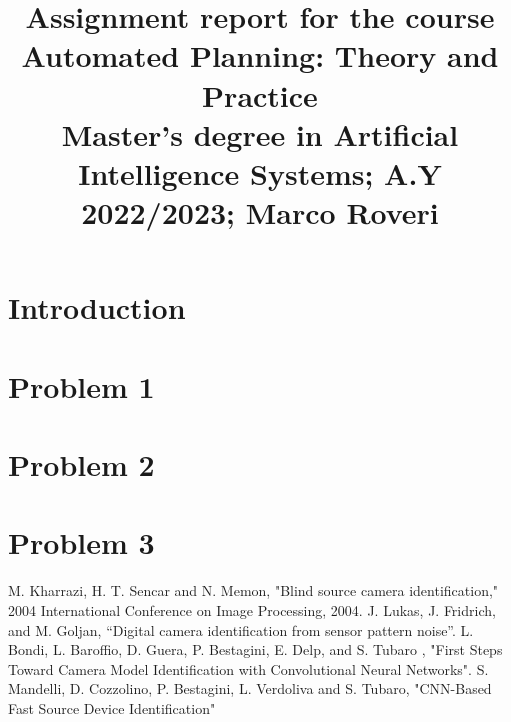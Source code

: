 \documentclass[conference]{IEEEtran}
\begin{document}
\title{Assignment report for the course\\ Automated Planning: Theory and Practice\\
{\footnotesize Master's degree in Artificial Intelligence Systems;
A.Y 2022/2023;
Marco Roveri}
}

\author{

\and
{}

}

\maketitle

\section{Introduction}

\section{Problem 1}

\section{Problem 2}

\section{Problem 3}


\begin{thebibliography}{00}
 M. Kharrazi, H. T. Sencar and N. Memon, "Blind source camera identification," 2004 International Conference on Image Processing, 2004.
 J. Lukas, J. Fridrich, and M. Goljan, “Digital camera identification from sensor pattern noise”.
 L. Bondi, L. Baroffio, D. Guera, P. Bestagini, E. Delp, and S. Tubaro , "First Steps Toward Camera Model Identification with Convolutional Neural Networks".
 S. Mandelli, D. Cozzolino, P. Bestagini, L. Verdoliva and S. Tubaro, "CNN-Based Fast Source Device Identification"
\end{thebibliography}
\vspace{12pt}
\end{document}
